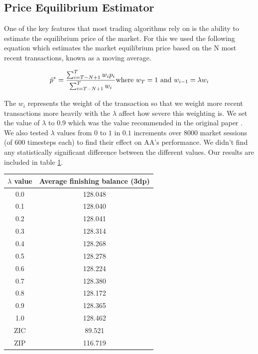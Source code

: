 \documentclass{acm_proc_article-sp}
\begin{document}
\subsection{Price Equilibrium Estimator}
One of the key features that most trading algorithms rely on is the ability to
estimate the equilibrium price of the market. For this we used the following
equation which estimates the market equilibrium price based on the N most
recent transactions, known as a moving average.

\begin{equation}
\hat p^* = \frac{\sum^T_{i=T-N+1}w_ip_i}{\sum^T_{i=T-N+1}w_i}\\
\text{where $w_T = 1$ and $w_{i-1} = \lambda w_i$}
\label{equest}
\end{equation}

The $w_i$ represents the weight of the transaction so that we weight more
recent transactions more heavily with the $\lambda$ affect how severe this
weighting is. We set the value of $\lambda$ to 0.9 which was the value
recommended in the original paper \cite[p.~100]{AA_thesis}.\\

We also tested $\lambda$ values from $0$ to $1$ in $0.1$ increments over 8000 
market sessions (of 600 timesteps each) to find their effect on AA's performance. We didn't find any
statistically significant difference between the different values. Our results
are included in table \ref{tbl:lambda_results}.
\begin{table}
  \centering
  \label{tbl:lambda_results}
  \begin{tabular}{ | c | c | }
    \hline
    \textbf{$\lambda$ value} & \textbf{Average finishing balance (3dp)} \\
    \hline
    0.0 & 128.048 \\
    0.1 & 128.040 \\
    0.2 & 128.041 \\
    0.3 & 128.314 \\
    0.4 & 128.268 \\
    0.5 & 128.278 \\
    0.6 & 128.224 \\
    0.7 & 128.380 \\
    0.8 & 128.172 \\
    0.9 & 128.365 \\
    1.0 & 128.462 \\
    \hline \hline
    ZIC & 89.521 \\
    ZIP & 116.719 \\
    \hline
  \end{tabular}
\end{table}
\end{document}
